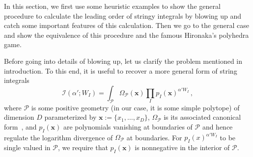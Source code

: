 \documentclass[12pt]{article}
\theoremstyle{definition}
\theoremstyle{plain}
\begin{document}
% 

In this section, we first use some heuristic examples 
to show the general procedure to calculate the leading order of stringy integrals
by blowing up and catch some important features of this calculation.
Then we go to the general case and show the equivalence of this procedure 
and the famous Hironaka's polyhedra game.

Before going into details of blowing up, let us clarify the problem mentioned in introduction. To this end, it is useful to recover a more general form of string integrals
\begin{equation*}
  \mathcal{I}(\alpha';W_{I})=\int_{\mathcal{P}} \Omega_{\mathcal{P}}(\mathbf{x}) \prod_{I}p_{I}(\mathbf{x})^{\alpha'W_{I}}\,,
\end{equation*}
where $\mathcal{P}$ is some positive geometry (in our case, it is some simple polytope) of dimension $D$ parameterized by $\mathbf{x}:= \{x_{1},\ldots,x_{D}\}$, $\Omega_{\mathcal{P}}$ is its associated canonical form~\cite{}, and $p_{I}(\mathbf{x})$ are polynomials vanishing at boundaries of $\mathcal{P}$ and hence regulate the logarithm divergence of $\Omega_{\mathcal{P}}$ at boundaries. For $p_{I}(x)^{\alpha' W_{I}}$ to be single valued in $\mathcal{P}$, we require that $p_{I}(\mathbf{x})$ is nonnegative in the interior of $\mathcal{P}$. %
\end{document}
